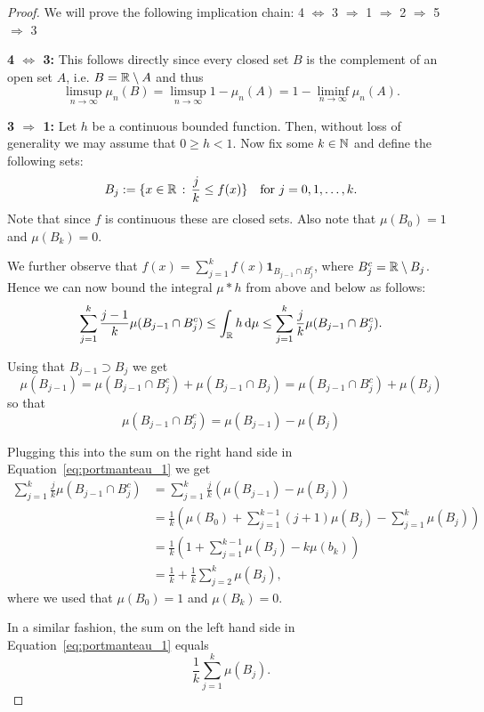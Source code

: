 \begin{proof}
We will prove the following implication chain: 4 $\iff$ 3 $\Rightarrow$ 1 $\Rightarrow$ 2 $\Rightarrow$ 5 $\Rightarrow$ 3  

\textbf{4 $\iff$ 3:} This follows directly since every closed set $B$ is the complement of an open set $A$, i.e. $B = \mathbb R \setminus A$ and thus
\[
	\limsup_{n \to \infty} \mu_n(B) = \limsup_{n \to \infty} 1 - \mu_n(A) = 1 - \liminf_{n \to \infty} \mu_n(A).
\]

\textbf{3 $\Rightarrow$ 1:} Let $h$ be a continuous bounded function. Then, without loss of generality we may assume that $0 \ge h < 1$. Now fix some $k \in \mathbb N$ and define the following sets:
\[
	B_j := \{x \in \mathbb R \, : \, \frac{j}{k} \le f(x)\} \quad \text{for } j = 0, 1, \dots, k.
\]
Note that since $f$ is continuous these are closed sets. Also note that $\mu(B_0) = 1$ and $\mu(B_k) = 0$.

We further observe that $f(x) = \sum_{j = 1}^k f(x) \mathbf{1}_{B_{j-1} \cap B_j^c}$, where $B_j^c = \mathbb R \setminus B_j$. Hence we can now bound the integral $\mu \ast h$ from above and below as follows:
\begin{equation}\label{eq:portmanteau_1}
	\sum_{j = 1}^k \frac{j-1}{k} \mu(B_{j - 1} \cap B_j^c) \le \int_{\mathbb R} h \, \mathrm{d} \mu \le \sum_{j = 1}^k \frac{j}{k} \mu(B_{j - 1} \cap B_j^c).
\end{equation}

Using that $B_{j-1} \supset B_{j}$ we get
\[
	\mu(B_{j - 1}) = \mu(B_{j-1} \cap B_j^c) + \mu(B_{j-1} \cap B_j) = \mu(B_{j-1} \cap B_j^c) + \mu(B_j)
\]
so that
\[
	\mu(B_{j-1} \cap B_j^c) = \mu(B_{j-1}) - \mu(B_j)
\]

Plugging this into the sum on the right hand side in Equation~\eqref{eq:portmanteau_1} we get
\begin{align*}
	\sum_{j = 1}^k \frac{j}{k} \mu(B_{j - 1} \cap B_j^c) &= \sum_{j = 1}^k \frac{j}{k} (\mu(B_{j-1}) - \mu(B_j))\\
	&= \frac{1}{k} \left(\mu(B_0) + \sum_{j = 1}^{k-1} (j+1) \mu(B_j) - \sum_{j = 1}^k \mu(B_j)\right) \\
	&= \frac{1}{k} \left(1 + \sum_{j = 1}^{k-1} \mu(B_j) - k \mu(b_k)\right)\\
	&= \frac{1}{k} + \frac{1}{k} \sum_{j = 2}^{k} \mu(B_j),
\end{align*}
where we used that $\mu(B_0) = 1$ and $\mu(B_k) = 0$.

In a similar fashion, the sum on the left hand side in Equation~\eqref{eq:portmanteau_1} equals
\[
	\frac{1}{k} \sum_{j = 1}^k \mu(B_j).
\]


\end{proof}
